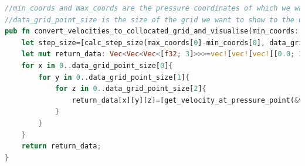 \documentclass{article}
\begin{document}
\begin{lstlisting}[language=Rust, style=boxed, breaklines=true]
//min_coords and max_coords are the pressure coordinates of which we want to know the velocities(this function will determine those velocities by taking the average of nearby velocities)
//data_grid_point_size is the size of the grid we want to show to the user
pub fn convert_velocities_to_collocated_grid_and_visualise(min_coords: [usize; 3], max_coords: [usize;3], data_grid_point_size: [usize; 3], velocity_grid_x: &VelocityGrid, velocity_grid_y: &VelocityGrid, velocity_grid_z: &VelocityGrid) -> Vec<Vec<Vec<[f32;3]>>>{
    let step_size=[calc_step_size(max_coords[0]-min_coords[0], data_grid_point_size[0]), calc_step_size(max_coords[1]-min_coords[1], data_grid_point_size[1]), calc_step_size(max_coords[2]-min_coords[2], data_grid_point_size[2])];
    let mut return_data: Vec<Vec<Vec<[f32; 3]>>>=vec![vec![vec![[0.0; 3]; data_grid_point_size[0]]; data_grid_point_size[1]]; data_grid_point_size[0]];
    for x in 0..data_grid_point_size[0]{
        for y in 0..data_grid_point_size[1]{
            for z in 0..data_grid_point_size[2]{
                return_data[x][y][z]=[get_velocity_at_pressure_point(&velocity_grid_x, x*step_size[0], y*step_size[1], z*step_size[2]),  get_velocity_at_pressure_point(&velocity_grid_y, x*step_size[0], y*step_size[1], z*step_size[2]), get_velocity_at_pressure_point(&velocity_grid_z, x*step_size[0], y*step_size[1], z*step_size[2])];
            }
        }
    }
    return return_data;
}
\end{lstlisting}
\end{document}
